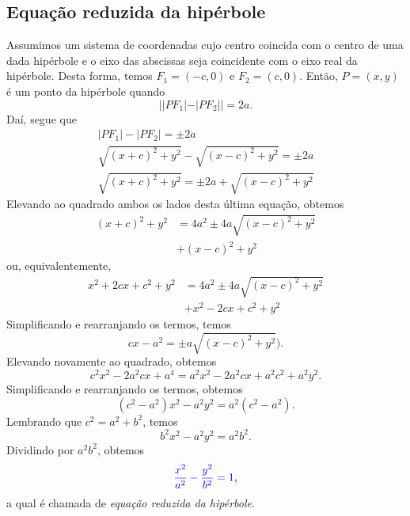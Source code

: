 \subsection{Equação reduzida da hipérbole}

Assumimos um sistema de coordenadas cujo centro coincida com o centro de uma dada hipérbole e o eixo das abscissas seja coincidente com o eixo real da hipérbole. Desta forma, temos $F_1 = (-c,0)$ e $F_2 = (c,0)$. Então, $P=(x,y)$ é um ponto da hipérbole quando
\begin{equation}
  ||PF_1|-|PF_2|| = 2a.
\end{equation}
Daí, segue que
\begin{gather}
  |PF_1|-|PF_2| = \pm 2a \\
  \sqrt{(x+c)^2+y^2}-\sqrt{(x-c)^2+y^2} =\pm 2a\\
  \sqrt{(x+c)^2+y^2} = \pm 2a + \sqrt{(x-c)^2+y^2}
\end{gather}
Elevando ao quadrado ambos os lados desta última equação, obtemos
\begin{align}
  (x+c)^2+y^2 &= 4a^2 \pm 4a\sqrt{(x-c)^2+y^2} \\
              &+ (x-c)^2+y^2
\end{align}
ou, equivalentemente,
\begin{align}
  x^2+2cx+c^2+y^2 &= 4a^2\pm4a\sqrt{(x-c)^2+y^2}\\
                  &+x^2-2cx+c^2+y^2
\end{align}
Simplificando e rearranjando os termos, temos
\begin{equation}
  cx - a^2 = \pm a\sqrt{(x-c)^2+y^2}).
\end{equation}
Elevando novamente ao quadrado, obtemos
\begin{equation}
  c^2x^2 - 2a^2cx + a^4 = a^2x^2 - 2a^2cx + a^2c^2 + a^2y^2.
\end{equation}
Simplificando e rearranjando os termos, obtemos
\begin{equation}
  (c^2-a^2)x^2 - a^2y^2 = a^2(c^2-a^2).
\end{equation}
Lembrando que $c^2 = a^2 + b^2$, temos
\begin{equation}
  b^2x^2 - a^2y^2 = a^2b^2.
\end{equation}
Dividindo por $a^2b^2$, obtemos
\begin{equation}\label{eq:hiperbole_red}
  {\color{blue}\frac{x^2}{a^2} - \frac{y^2}{b^2} = 1},
\end{equation}
a qual é chamada de \emph{equação reduzida da hipérbole}.

